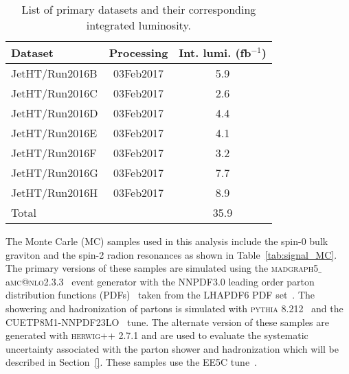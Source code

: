 \begin{table}[htb]
  \begin{center}
    \begin{tabular}{l|c|c}
      \hline
      \hline
      Dataset & Processing & Int. lumi. (fb$^{-1}$) \\
      \hline
      JetHT/Run2016B   & 03Feb2017 & 5.9  \\
      JetHT/Run2016C   & 03Feb2017 & 2.6  \\
      JetHT/Run2016D   & 03Feb2017 & 4.4  \\
      JetHT/Run2016E   & 03Feb2017 & 4.1  \\
      JetHT/Run2016F   & 03Feb2017 & 3.2  \\
      JetHT/Run2016G   & 03Feb2017 & 7.7  \\
      JetHT/Run2016H   & 03Feb2017 & 8.9 \\
      \hline
      Total & & 35.9 \\
      \hline
      \hline
    \end{tabular}
  \end{center}
 \caption{List of primary datasets and their corresponding integrated luminosity.\label{tab:data}}
\end{table}

The Monte Carle (MC) samples used in this analysis include the spin-0 bulk graviton and the spin-2 radion resonances as shown in Table~\ref{tab:signal_MC}. The primary versions of these samples are simulated using the \textsc{madgraph5}$\_$a\textsc{mc}\textsc{@nlo}2.3.3~\cite{MADGRAPH} event generator with the NNPDF3.0 leading order parton distribution functions (PDFs)~\cite{PDFs} taken from the LHAPDF6 PDF set~\cite{PDF2, PDF3, PDF4, PDF5}. The showering and hadronization of partons is simulated with \textsc{pythia} 8.212~\cite{Pythia} and the CUETP8M1-NNPDF23LO~\cite{CUET} tune. The alternate version of these samples are generated with \textsc{herwig++} 2.7.1 and are used to evaluate the systematic uncertainty associated with the parton shower and hadronization which will be described in Section~\ref{}. These samples use the EE5C tune~\cite{EE5C}.


